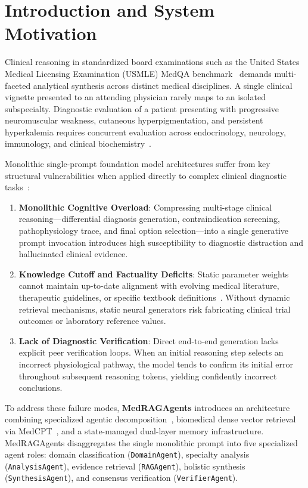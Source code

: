 \section{Introduction and System Motivation}
\label{sec:introduction}

Clinical reasoning in standardized board examinations such as the United States Medical Licensing Examination (USMLE) MedQA benchmark~\cite{jin2021medqa} demands multi-faceted analytical synthesis across distinct medical disciplines. A single clinical vignette presented to an attending physician rarely maps to an isolated subspecialty. Diagnostic evaluation of a patient presenting with progressive neuromuscular weakness, cutaneous hyperpigmentation, and persistent hyperkalemia requires concurrent evaluation across endocrinology, neurology, immunology, and clinical biochemistry~\cite{singhal2023large, nori2023can}. 

Monolithic single-prompt foundation model architectures suffer from key structural vulnerabilities when applied directly to complex clinical diagnostic tasks~\cite{wei2022chain, tang2023medagents}:

\begin{enumerate}
    \item \textbf{Monolithic Cognitive Overload}: Compressing multi-stage clinical reasoning—differential diagnosis generation, contraindication screening, pathophysiology trace, and final option selection—into a single generative prompt invocation introduces high susceptibility to diagnostic distraction and hallucinated clinical evidence.
    \item \textbf{Knowledge Cutoff and Factuality Deficits}: Static parameter weights cannot maintain up-to-date alignment with evolving medical literature, therapeutic guidelines, or specific textbook definitions~\cite{lewis2020retrieval, xiong2023medrag}. Without dynamic retrieval mechanisms, static neural generators risk fabricating clinical trial outcomes or laboratory reference values.
    \item \textbf{Lack of Diagnostic Verification}: Direct end-to-end generation lacks explicit peer verification loops. When an initial reasoning step selects an incorrect physiological pathway, the model tends to confirm its initial error throughout subsequent reasoning tokens, yielding confidently incorrect conclusions.
\end{enumerate}

To address these failure modes, \textbf{MedRAGAgents} introduces an architecture combining specialized agentic decomposition~\cite{tang2023medagents, wu2023autogen, park2023generative}, biomedical dense vector retrieval via MedCPT~\cite{jin2023medcpt}, and a state-managed dual-layer memory infrastructure. MedRAGAgents disaggregates the single monolithic prompt into five specialized agent roles: domain classification (\texttt{DomainAgent}), specialty analysis (\texttt{AnalysisAgent}), evidence retrieval (\texttt{RAGAgent}), holistic synthesis (\texttt{SynthesisAgent}), and consensus verification (\texttt{VerifierAgent}). 

